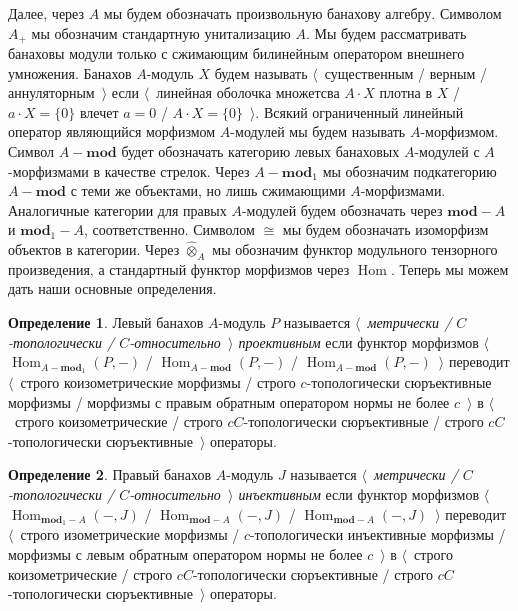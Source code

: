 \documentclass{article}
\numberwithin{equation}{section}
\theoremstyle{plain}
\theoremstyle{definition}
\newtheorem{definition}{Определение}
\newcommand{\projtens}{\mathbin{\widehat{\otimes}}}
\newcommand{\isom}{\mathop{\mathbin{\cong}}}
\begin{document}
\begin{fulltext}
Далее, через $A$ мы будем обозначать произвольную банахову алгебру. Символом
$A_+$ мы обозначим стандартную унитализацию $A$. Мы будем рассматривать банаховы
модули только с сжимающим билинейным оператором внешнего умножения. Банахов
$A$-модуль $X$ будем называть $\langle$~существенным / верным /
аннуляторным~$\rangle$ если $\langle$~линейная оболочка множетсва $A\cdot X$
плотна в $X$ / $a\cdot X=\{0\}$ влечет $a=0$ / $A\cdot X=\{0\}$~$\rangle$.
Всякий ограниченный линейный оператор являющийся морфизмом $A$-модулей мы будем
называть $A$-морфизмом. Символ $A-\mathbf{mod}$ будет обозначать категорию левых
банаховых $A$-модулей с $A$-морфизмами в качестве стрелок. Через
$A-\mathbf{mod}_1$ мы обозначим подкатегорию $A-\mathbf{mod}$ с теми же
объектами, но лишь сжимающими $A$-морфизмами. Аналогичные категории для правых
$A$-модулей будем обозначать через $\mathbf{mod}-A$ и $\mathbf{mod}_1-A$,
соответственно. Символом $\isom$ мы будем обозначать изоморфизм объектов в
категории. Через $\projtens_A$ мы обозначим функтор модульного тензорного
произведения, а стандартный функтор морфизмов через $\operatorname{Hom}$. Теперь
мы можем дать наши основные определения.

\begin{definition} Левый банахов $A$-модуль $P$ называется
\emph{$\langle$~метрически / $C$-топологически / 
$C$-относительно~$\rangle$ проективным} 
если функтор морфизмов $\langle$~$\operatorname{Hom}_{A-\mathbf{mod}_1}(P,-)$ /
$\operatorname{Hom}_{A-\mathbf{mod}}(P,-)$ /
$\operatorname{Hom}_{A-\mathbf{mod}}(P,-)$~$\rangle$ переводит $\langle$~строго
коизометрические морфизмы / строго $c$-топологически сюръективные морфизмы /
морфизмы с правым обратным оператором нормы не более $c$~$\rangle$ в
$\langle$~строго коизометрические / строго $c C$-топологически сюръективные /
строго $c C$-топологически сюръективные~$\rangle$ операторы.
\end{definition}

\begin{definition} Правый банахов $A$-модуль $J$ называется
\emph{$\langle$~метрически / $C$-топологически / $C$-относительно~$\rangle$
инъективным} если функтор морфизмов
$\langle$~$\operatorname{Hom}_{\mathbf{mod}_1-A}(-,J)$ /
$\operatorname{Hom}_{\mathbf{mod}-A}(-,J)$ /
$\operatorname{Hom}_{\mathbf{mod}-A}(-,J)$~$\rangle$ переводит $\langle$~строго
изометрические морфизмы / $c$-топологически инъективные морфизмы / морфизмы с
левым обратным оператором нормы не более $c$~$\rangle$ в $\langle$~строго
коизометрические / строго $c C$-топологически сюръективные / строго $c
C$-топологически сюръективные~$\rangle$ операторы.
\end{definition}


\end{fulltext}
\end{document}
